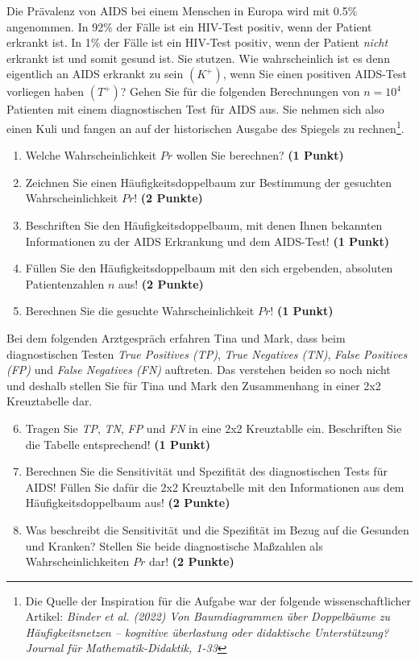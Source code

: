 \documentclass[a4paper, 9pt]{scrartcl}\usepackage[]{graphicx}\usepackage[]{xcolor}
\begin{document}
Die Prävalenz von AIDS bei einem Menschen in Europa wird mit 0.5\% angenommen. In 92\% der Fälle ist ein HIV-Test positiv, wenn der Patient erkrankt ist. In 1\% der Fälle ist ein HIV-Test positiv, wenn der Patient \textit{nicht} erkrankt ist und somit gesund ist. Sie stutzen. Wie wahrscheinlich ist es denn eigentlich an AIDS erkrankt zu sein $(K^+)$, wenn Sie einen positiven AIDS-Test vorliegen haben $(T^+)$? Gehen Sie für die folgenden Berechnungen von $n = \ensuremath{10^{4}}$ Patienten mit einem diagnostischen Test für AIDS aus. Sie nehmen sich also einen Kuli und fangen an auf der historischen Ausgabe des Spiegels zu rechnen\footnote{Die Quelle der Inspiration für die Aufgabe war der folgende wissenschaftlicher Artikel: \textit{Binder et al. (2022) Von Baumdiagrammen über Doppelbäume zu Häufigkeitsnetzen -- kognitive überlastung oder didaktische Unterstützung? Journal für Mathematik-Didaktik, 1-33}}.


\begin{enumerate}
\item Welche Wahrscheinlichkeit $Pr$ wollen Sie berechnen? \textbf{(1 Punkt)}
\item Zeichnen Sie einen Häufigkeitsdoppelbaum zur Bestimmung der gesuchten Wahrscheinlichkeit $Pr$! \textbf{(2 Punkte)} \item Beschriften Sie den Häufigkeitsdoppelbaum, mit denen Ihnen bekannten Informationen zu der AIDS Erkrankung und dem AIDS-Test! \textbf{(1 Punkt)}
\item Füllen Sie den Häufigkeitsdoppelbaum mit den sich ergebenden, absoluten Patientenzahlen $n$ aus! \textbf{(2 Punkte)}
\item Berechnen Sie die gesuchte Wahrscheinlichkeit $Pr$! \textbf{(1 Punkt)}
\end{enumerate}

Bei dem folgenden Arztgespräch erfahren Tina und Mark, dass beim diagnostischen Testen \textit{True Positives (TP)}, \textit{True Negatives (TN)}, \textit{False Positives (FP)} und \textit{False Negatives (FN)} auftreten. Das verstehen beiden so noch nicht und deshalb stellen Sie für Tina und Mark den Zusammenhang in einer 2x2 Kreuztabelle dar.

\begin{enumerate}
  \setcounter{enumi}{5}
\item Tragen Sie \textit{TP}, \textit{TN}, \textit{FP} und \textit{FN} in eine 2x2 Kreuztablle ein. Beschriften Sie die Tabelle entsprechend! \textbf{(1 Punkt)}
\item Berechnen Sie die Sensitivität und Spezifität des diagnostischen Tests für AIDS! Füllen Sie dafür die 2x2 Kreuztabelle mit den Informationen aus dem Häufigkeitsdoppelbaum aus! \textbf{(2 Punkte)}
\item Was beschreibt die Sensitivität und die Spezifität im Bezug auf die Gesunden und Kranken? Stellen Sie beide diagnostische Maßzahlen als Wahrscheinlichkeiten $Pr$ dar! \textbf{(2 Punkte)} 
\end{enumerate}
\end{document}
